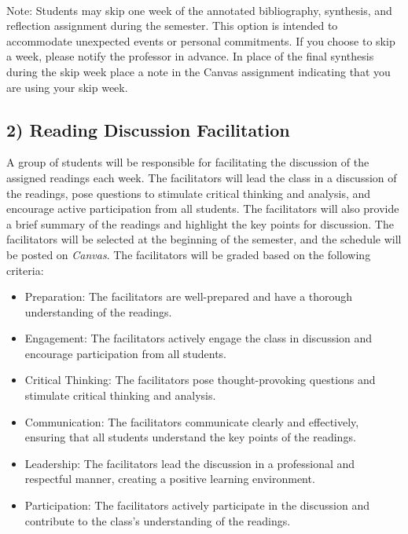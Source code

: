 \documentclass[11pt, letterpaper]{article}
\begin{document}
\paragraph{} Note: Students may skip one week of the annotated bibliography, synthesis, and reflection assignment during the semester. This option is intended to accommodate unexpected events or personal commitments. If you choose to skip a week, please notify the professor in advance. In place of the final synthesis during the skip week place a note in the Canvas assignment indicating that you are using your skip week.

\subsection*{2) Reading Discussion Facilitation}
A group of students will be responsible for facilitating the discussion of the assigned readings each week. The facilitators will lead the class in a discussion of the readings, pose questions to stimulate critical thinking and analysis, and encourage active participation from all students. The facilitators will also provide a brief summary of the readings and highlight the key points for discussion. The facilitators will be selected at the beginning of the semester, and the schedule will be posted on \emph{Canvas}. The facilitators will be graded based on the following criteria:

\begin{itemize}
    \item Preparation: The facilitators are well-prepared and have a thorough understanding of the readings.
    \item Engagement: The facilitators actively engage the class in discussion and encourage participation from all students.
    \item Critical Thinking: The facilitators pose thought-provoking questions and stimulate critical thinking and analysis.
    \item Communication: The facilitators communicate clearly and effectively, ensuring that all students understand the key points of the readings.
    \item Leadership: The facilitators lead the discussion in a professional and respectful manner, creating a positive learning environment.
    \item Participation: The facilitators actively participate in the discussion and contribute to the class's understanding of the readings.
\end{itemize}
\end{document}
